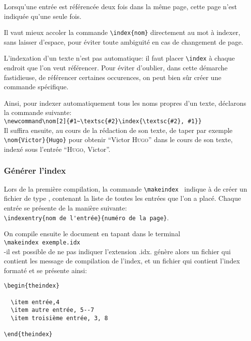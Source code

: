  Lorsqu'une entrée est référencée deux fois dans la même page, cette page n'est indiquée qu'une seule fois. 

\begin{attention}
Il vaut mieux accoler la commande \verb+\index{nom}+ directement au  mot à indexer, sans laisser d'espace, pour éviter toute ambiguité en cas de changement de page.

\end{attention}

L'indexation d'un texte n'est pas automatique: il faut placer \verb+\index+ à chaque endroit  que l'on veut référencer. Pour éviter d'oublier, dans cette démarche fastidieuse, de référencer certaines occurences, on  peut bien sûr créer une commande  spécifique.

Ainsi, pour indexer automatiquement tous les noms propres d'un texte, déclarons la commande suivante:\\
 \verb+\newcommand\nom[2]{#1~\textsc{#2}\index{\textsc{#2}, #1}}+\\
Il suffira ensuite, au cours de la rédaction de son texte, de taper par exemple \verb|\nom{Victor}{Hugo}| pour obtenir \enquote{Victor \textsc{Hugo}} dans le cours de son texte, indexé sous l'entrée \enquote{\textsc{Hugo}, Victor}.


\subsubsection{Générer l'index}


 Lors de la première compilation, la commande \verb|\makeindex | indique à \latex de créer un fichier de type , contenant la liste de toutes les entrées que l'on a placé. Chaque entrée se présente de la manière suivante:\\
\verb+\indexentry{nom de l'entrée}{numéro de la page}+.

On compile ensuite le document en tapant dans le terminal \\ \verb+\makeindex exemple.idx + \\
-il est possible de ne pas indiquer l'extension .idx. \latex génère alors un fichier  qui contient les message de compilation de l'index, et un fichier  qui contient l'index formaté et se présente ainsi:
\begin{verbatim}
\begin{theindex}

  \item entrée,4
  \item autre entrée, 5--7
  \item troisième entrée, 3, 8	

\end{theindex} 

\end{verbatim}

